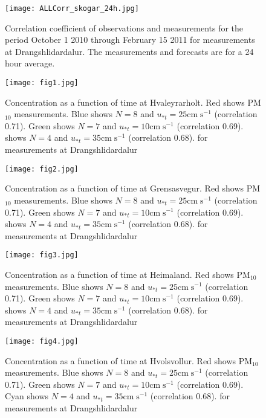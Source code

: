 \begin{figure}[t]
\texttt{[image: ALLCorr\_skogar\_24h.jpg]}
\caption{Correlation coefficient of observations and measurements for the period October 1 2010 through February 15 2011
for measurements at  Drangshlidardalur. The measurements and forecasts are for a 24 hour average.}
\label{fig:correlationsd}
\end{figure}


\begin{figure}[t]
\texttt{[image: fig1.jpg]}
\caption{Concentration as a function of time at Hvaleyrarholt.
Red shows PM$_10$ measurements. Blue shows $N=8$ and $u_{*t}=25\mathrm{cm}\;\mathrm{s}^{-1}$ (correlation 0.71).
Green shows $N=7$ and $u_{*t}=10\mathrm{cm}\;\mathrm{s}^{-1}$ (correlation 0.69).
shows $N=4$ and $u_{*t}=35\mathrm{cm}\;\mathrm{s}^{-1}$ (correlation 0.68).
for measurements at  Drangshlidardalur}
\label{fig:concplota}
\end{figure}

\begin{figure}[t]
\texttt{[image: fig2.jpg]}
\caption{Concentration as a function of time at Grensasvegur.
Red shows PM$_10$ measurements. Blue shows $N=8$ and $u_{*t}=25\mathrm{cm}\;\mathrm{s}^{-1}$ (correlation 0.71).
Green shows $N=7$ and $u_{*t}=10\mathrm{cm}\;\mathrm{s}^{-1}$ (correlation 0.69).
shows $N=4$ and $u_{*t}=35\mathrm{cm}\;\mathrm{s}^{-1}$ (correlation 0.68).
for measurements at  Drangshlidardalur}
\label{fig:concplotb}
\end{figure}

\begin{figure}[t]
\texttt{[image: fig3.jpg]}
\caption{Concentration as a function of time at Heimaland.
Red shows PM$_10$ measurements. Blue shows $N=8$ and $u_{*t}=25\mathrm{cm}\;\mathrm{s}^{-1}$ (correlation 0.71).
Green shows $N=7$ and $u_{*t}=10\mathrm{cm}\;\mathrm{s}^{-1}$ (correlation 0.69).
shows $N=4$ and $u_{*t}=35\mathrm{cm}\;\mathrm{s}^{-1}$ (correlation 0.68).
for measurements at  Drangshlidardalur}
\label{fig:concplotc}
\end{figure}

\begin{figure}[t]
\texttt{[image: fig4.jpg]}
\caption{Concentration as a function of time at Hvolsvollur.
Red shows PM$_10$ measurements. Blue shows $N=8$ and $u_{*t}=25\mathrm{cm}\;\mathrm{s}^{-1}$ (correlation 0.71).
Green shows $N=7$ and $u_{*t}=10\mathrm{cm}\;\mathrm{s}^{-1}$ (correlation 0.69).
Cyan shows $N=4$ and $u_{*t}=35\mathrm{cm}\;\mathrm{s}^{-1}$ (correlation 0.68).
for measurements at  Drangshlidardalur}
\label{fig:concplotd}
\end{figure}

